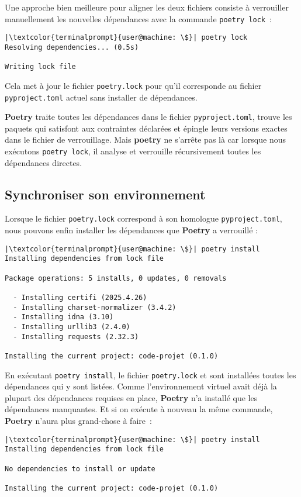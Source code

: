Une approche bien meilleure pour aligner les deux fichiers consiste à verrouiller manuellement les nouvelles dépendances avec la commande \texttt{poetry lock} :
\begin{lstlisting}[style=terminal]
|\textcolor{terminalprompt}{user@machine: \$}| poetry lock
Resolving dependencies... (0.5s)

Writing lock file
\end{lstlisting}

Cela met à jour le fichier \texttt{poetry.lock} pour qu’il corresponde au fichier \texttt{pyproject.toml} actuel sans installer de dépendances.

\textbf{Poetry} traite toutes les dépendances dans le fichier \texttt{pyproject.toml}, trouve les paquets qui satisfont aux contraintes déclarées et épingle leurs versions exactes dans le fichier de verrouillage. Mais \textbf{poetry} ne s’arrête pas là car lorsque nous exécutons \texttt{poetry lock}, il analyse et verrouille récursivement toutes les dépendances directes.

\subsection*{Synchroniser son environnement}
Lorsque le fichier \texttt{poetry.lock} correspond à son homologue \texttt{pyproject.toml}, nous pouvons enfin installer les dépendances que \textbf{Poetry} a verrouillé :
\begin{lstlisting}[style=terminal]
|\textcolor{terminalprompt}{user@machine: \$}| poetry install
Installing dependencies from lock file

Package operations: 5 installs, 0 updates, 0 removals

  - Installing certifi (2025.4.26)
  - Installing charset-normalizer (3.4.2)
  - Installing idna (3.10)
  - Installing urllib3 (2.4.0)
  - Installing requests (2.32.3)

Installing the current project: code-projet (0.1.0)
\end{lstlisting}

En exécutant \texttt{poetry install}, le fichier \texttt{poetry.lock} et sont installées toutes les dépendances qui y sont listées. Comme l'environnement virtuel avait déjà la plupart des dépendances requises en place, \textbf{Poetry} n’a installé que les dépendances manquantes. Et si on exécute à nouveau la même commande, \textbf{Poetry} n’aura plus grand-chose à faire :
\begin{lstlisting}[style=terminal]
|\textcolor{terminalprompt}{user@machine: \$}| poetry install
Installing dependencies from lock file

No dependencies to install or update

Installing the current project: code-projet (0.1.0)
\end{lstlisting}

